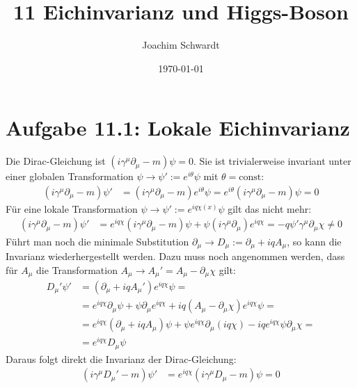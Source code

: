 \documentclass[a4paper,12pt]{article}
\newcommand{\kla}{}
\newcommand{\tecxt}{}
\begin{document}
\title{11 Eichinvarianz und Higgs-Boson}
\author{Joachim Schwardt}
\date{\today}
\maketitle

\section*{Aufgabe 11.1: Lokale Eichinvarianz}
Die Dirac-Gleichung ist $(i\gamma^\mu\partial_\mu - m)\psi=0$. Sie ist trivialerweise invariant unter einer globalen Transformation $\psi\rightarrow\psi':=e^{i\theta}\psi$ mit $\theta=\tecxt\text{const}$:
\begin{align*}
(i\gamma^\mu\partial_\mu - m)\psi'&=(i\gamma^\mu\partial_\mu - m)e^{i\theta}\psi=e^{i\theta}(i\gamma^\mu\partial_\mu - m)\psi=0
\end{align*}
Für eine lokale Transformation $\psi\rightarrow\psi':=e^{iq\chi(x)}\psi$ gilt das nicht mehr:
\begin{align*}
(i\gamma^\mu\partial_\mu - m)\psi'&=e^{iq\chi}(i\gamma^\mu\partial_\mu - m)\psi + \psi (i\gamma^\mu\partial_\mu ) e^{iq\chi}=-q\psi'\gamma^\mu\partial_\mu\chi\neq 0
\end{align*}
Führt man noch die minimale Substitution $\partial_\mu\rightarrow D_\mu :=\partial_\mu +iqA_\mu$, so kann die Invarianz wiederhergestellt werden. Dazu muss noch angenommen werden, dass für $A_\mu$ die Transformation $A_\mu\rightarrow A_\mu'=A_\mu - \partial_\mu\chi$ gilt:
\begin{align*}
D_\mu'\psi'&=(\partial_\mu +iqA_\mu')e^{iq\chi}\psi=\\
&=e^{iq\chi}\partial_\mu\psi + \psi\partial_\mu e^{iq\chi} + iq(A_\mu - \partial_\mu\chi)e^{iq\chi}\psi=\\
&=e^{iq\chi}\kla\left( {\partial_\mu +iqA_\mu } \right)\psi +\psi e^{iq\chi}\partial_\mu (iq\chi ) - iqe^{iq\chi}\psi\partial_\mu\chi=\\
&=e^{iq\chi}D_\mu\psi
\end{align*}
Daraus folgt direkt die Invarianz der Dirac-Gleichung:
\begin{align*}
(i\gamma^\mu D_\mu' - m)\psi'&=e^{iq\chi}(i\gamma^\mu D_\mu - m)\psi=0
\end{align*}
\end{document}

